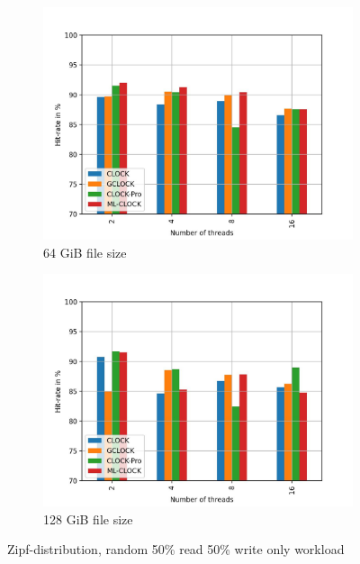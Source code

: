 \documentclass[
	12pt,
	a4paper,
	abstract,
	bibliography=totoc,
	chapterprefix,
	headings=openright,
	numbers=endperiod,
	parskip=half,
	twoside,
]{scrreprt}
\begin{document}
\begin{figure}[H]
\begin{subfigure}{0.4\textwidth}
		\includegraphics[width=\textwidth]{multi_64_gb_rw_50to50_zipf.jpg}		
		\caption{64 GiB file size}
		\label{fig:rw_50to50 64 zipf}
	\end{subfigure}
	\hfill
	\begin{subfigure}{0.4\textwidth}
		\includegraphics[width=\textwidth]{multi_128_gb_rw_50to50_zipf.jpg}		
		\caption{128 GiB file size}
		\label{fig:rw_50to50 128 zipf}
	\end{subfigure}
	\caption{Zipf-distribution, random 50\% read 50\% write only workload}
	\label{fig:multi zipf rw_50to50}
\end{figure}
\end{document}
